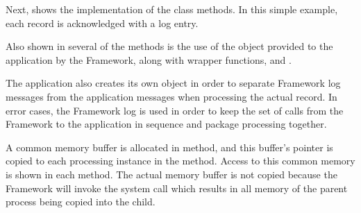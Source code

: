 Next,  shows the implementation of the class methods. In
this simple example, each record is acknowledged with a log entry.

Also shown in several of the methods is the use of the  object
provided to the application by the Framework, along with wrapper functions,
 and .

The application also creates its own
 object in order to separate Framework log messages from the
application messages when processing the actual record. In error cases, the
Framework log is used in order to keep the set of calls from the Framework
to the application in sequence and package processing together.

A common memory buffer is allocated in  method,
and this buffer's pointer is copied to each processing instance in the
 method. Access to this common memory is shown in each
 method. The actual memory buffer is not copied because
the Framework will invoke the system call  which results in all
memory of the parent process being copied into the child. 

